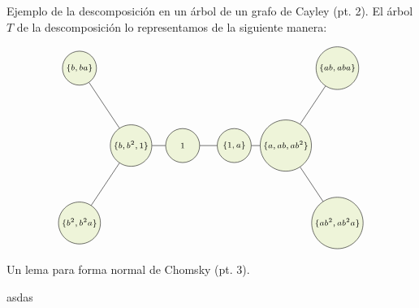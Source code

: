 \documentclass[aspectratio=169, 11pt]{beamer}
\begin{document}
	\begin{frame}[fragile]{Ejemplo de la descomposición en un árbol de un grafo de Cayley (pt. 2).}
		El árbol $T$ de la descomposición lo representamos de la siguiente manera:

	\[
			\begin{tikzpicture}[scale=0.8, V/.style = {circle, draw,align= center, minimum size=0.5cm,
			minimum size=3em,inner sep=2,
			fill=applegreen!15,font=\scriptsize	},fill fraction/.style={path picture={
				\fill[#1] 
				(path picture bounding box.south) rectangle
				(path picture bounding box.north west);
		}},
		fill fraction/.default=gray!50
		]
		\node[align=center] at (2, -6) {};
		\begin{scope}[nodes=V,xshift=4.5cm, yshift=-4cm]
			\node (1) at (0,0)  {$\{ b,b^2,1 \}$};
			\node (2) at (2,0)  {$1$};
			\node (3) at (4,0)  {$\{ 1,a \}$};
			\node (4) at (-2,3)     {$\{ b,ba \}$};
			\node (5) at (-2,-3)   {$\{b^2,b^2a\}$};
			\node (6) at (6,0)  {$\{ a,ab,ab^2 \}$};
			
			\node (9) at (8,3)  {$\{ab,aba\}$};
			\node (10) at (8,-3)  {$\{ ab^2, ab^2a \}$};
		\end{scope}
		
		
		\draw (1) edge[-] (2);
		\draw (2) edge[-] (3);
		\draw (1) edge[-] (5);
		\draw (1) edge[-] (4);
		\draw (3) edge[-] (6);
		\draw (6) edge[-] (9);
		\draw (6) edge[-] (10);
	\end{tikzpicture}
	\]
	\end{frame}

	\begin{frame}[fragile]{Un lema para forma normal de Chomsky (pt. 3).}
		
		asdas
		\TODO{}
	\end{frame}
	

\end{document}
